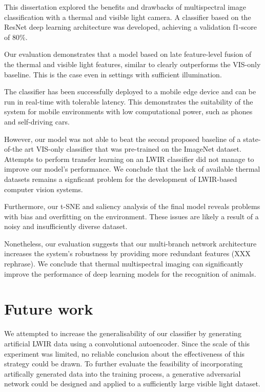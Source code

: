 \documentclass{l4proj}
\begin{document}
This dissertation explored the benefits and drawbacks of multispectral image classification with a thermal and visible light camera. A classifier based on the ResNet deep learning architecture was developed, achieving a validation f1-score of $80\%$.

Our evaluation demonstrates that a model based on late feature-level fusion of the thermal and visible light features, similar to \citet{wagner_multispectral_2016} clearly outperforms the VIS-only baseline. This is the case even in settings with sufficient illumination.

The classifier has been successfully deployed to a mobile edge device and can be run in real-time with tolerable latency. This demonstrates the suitability of the system for mobile environments with low computational power, such as phones and self-driving cars.

However, our model was not able to beat the second proposed baseline of a state-of-the art VIS-only classifier that was pre-trained on the ImageNet dataset. Attempts to perform transfer learning on an LWIR classifier did not manage to improve our model's performance. We conclude that the lack of available thermal datasets remains a signficant problem for the development of LWIR-based computer vision systems.

Furthermore, our t-SNE and saliency analysis of the final model reveals problems with bias and overfitting on the environment. These issues are likely a result of a noisy and insufficiently diverse dataset.

Nonetheless, our evaluation suggests that our multi-branch network architecture increases the system's robustness by providing more redundant features (XXX rephrase). We conclude that thermal multispectral imaging can significantly improve the performance of deep learning models for the recognition of animals.


\section{Future work}

We attempted to increase the generalisability of our classifier by generating artificial LWIR data using a convolutional autoencoder. Since the scale of this experiment was limited, no reliable conclusion about the effectiveness of this strategy could be drawn. To further evaluate the feasibility of incorporating artifically generated data into the training process, a generative adversarial network could be designed and applied to a sufficiently large visible light dataset.
\end{document}

